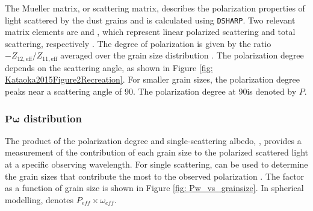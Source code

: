 The Mueller matrix, or scattering matrix, describes the polarization properties of light scattered by the dust grains \citep{Kataoka_2015} and is calculated using \texttt{DSHARP}. Two relevant matrix elements are \Zoo and \ZootNS, which represent linear polarized scattering and total scattering, respectively \citep{Zhang2023}. The degree of polarization is given by the ratio $-Z_{12, \text{eff}}/Z_{11, \text{eff}}$ averaged over the grain size distribution \citep{Kataoka_2015}.  The polarization degree depends on the scattering angle, as shown in Figure \ref{fig: Kataoka2015Figure2Recreation}. For smaller grain sizes, the polarization degree peaks near a scattering angle of  90\deggNS. The polarization degree at  90\degg is denoted by $P$. 







\subsubsection{$\mathbf{P\omega}$ distribution} 
The product of the polarization degree and single-scattering albedo, \PwNS, provides a measurement of the contribution of each grain size to the polarized scattered light at a specific observing wavelength. For single scattering, \Pweff can be used to determine the grain sizes that contribute the most to the observed polarization \citep{Kataoka_2015}. The \Pweff factor as a function of grain size is shown in Figure \ref{fig: Pw_vs_grainsize}. In spherical modelling,  \Pw denotes $P_{eff} \times \omega_{eff}$. 







%
%
%
%
%

%
%
%
%
%

